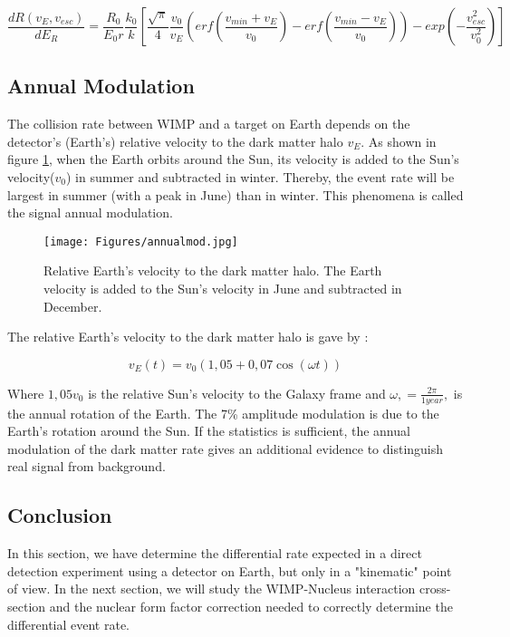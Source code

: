 \documentclass[a4paper, twoside, openany, 11pt]{book}
\begin{document}
\begin{equation}
\label{eq:diffrate_final}
\boxed{\frac{dR(v_E,v_{esc})}{dE_R} = \frac{R_0}{E_0 r} \frac{k_0}{k} \left[  \frac{\sqrt{\pi}}{4} \frac{v_0}{v_E} (erf(\frac{v_{min}+v_E}{v_0}) - erf(\frac{v_{min}-v_E}{v_0}) ) - exp(-\frac{v_{esc}^2}{v_0^2})      \right]  }
\end{equation}


\subsection{Annual Modulation}

The collision rate between WIMP and a target on Earth depends on the detector's (Earth's) relative velocity to the dark matter halo $v_E$. As shown in figure \ref{fig:annualmod}, when the Earth orbits around the Sun, its velocity is added to the Sun's velocity($v_0$) in summer and subtracted in winter. Thereby, the event rate will be largest in summer (with a peak in June) than in winter. This phenomena is called the signal annual modulation.

\begin{figure}[h]
	\centering
     \texttt{[image: Figures/annualmod.jpg]}
	\caption{Relative Earth's velocity to the dark matter halo. The Earth velocity is added to the Sun's velocity in June and subtracted in December.}
    \label{fig:annualmod}
\end{figure}

The relative Earth's velocity to the dark matter halo is gave by : 

\begin{equation}
v_E (t) = v_0 (1,05 + 0,07 \cos(\omega t))
\end{equation}

Where $1,05 v_0$ is the relative Sun's velocity to the Galaxy frame and $ \omega ,= \frac{2 \pi }{1 year},$ is the annual rotation of the Earth. The 7\% amplitude modulation is due to the Earth's rotation around the Sun. If the statistics is sufficient, the annual modulation of the dark matter rate gives an additional evidence to distinguish real signal from background. 

\subsection{Conclusion}

In this section, we have determine the differential rate expected in a direct detection experiment using a detector on Earth, but only in a "kinematic" point of view. In the next section, we will study the WIMP-Nucleus interaction cross-section and the nuclear form factor correction needed to correctly determine the differential event rate.
\end{document}
